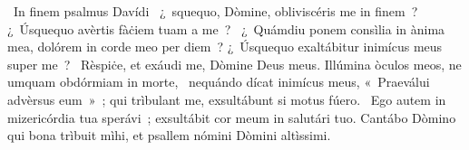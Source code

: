 {~In finem psalmus Davídi}
{%
~¿~squequo, Dòmine, obliviscéris me in finem~? ¿~Úsquequo avèrtis fàċiem tuam a me~?
~¿~Quámdiu ponem consìlia in ànima mea, dolórem in corde meo per diem~? ¿~Úsquequo exaltábitur inimícus meus super me~?
~Rèspiċe, et exáudi me, Dòmine Deus meus. Illúmina òculos meos, ne umquam obdórmiam in morte,
~nequándo dícat inimícus meus, «~Praeválui advèrsus eum~»~; qui trìbulant me, exsultábunt si motus fúero.
~Ego autem in mizericórdia tua sperávi~; exsultábit cor meum in salutári tuo. Cantábo Dòmino qui bona trìbuit mìhi, et psallem nómini Dòmini altìssimi.}
